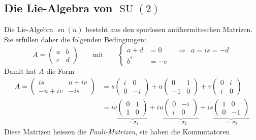 \subsection{Die Lie-Algebra von $\operatorname{SU}(2)$}
Die Lie-Algebra $\operatorname{su}(n)$ besteht aus den
spurlosen antihermiteschen Matrizen.
Sie erfüllen daher die folgenden Bedingungen:
\[
A=\begin{pmatrix}a&b\\c&d\end{pmatrix}
\qquad
\text{mit}
\qquad
\left\{
\begin{aligned}
a+d&=0&&\Rightarrow& a=is = -d
\\
b^*&=-c
\end{aligned}
\right.
\]
Damit hat $A$ die Form
\begin{align*}
A=\begin{pmatrix}
is&u+iv\\
-u+iv&-is
\end{pmatrix}
&=
s
\begin{pmatrix}
i&0\\
0&-i
\end{pmatrix}
+
u
\begin{pmatrix}
 0&1\\
-1&0
\end{pmatrix}
+
v
\begin{pmatrix}
0&i\\
i&0
\end{pmatrix}
\\
&=
iv\underbrace{\begin{pmatrix}0&1\\1&0\end{pmatrix}}_{\displaystyle=\sigma_1}
+
iu\underbrace{\begin{pmatrix}0&-i\\i&0\end{pmatrix}}_{\displaystyle=\sigma_2}
+
is\underbrace{\begin{pmatrix}1&0\\0&-1\end{pmatrix}}_{\displaystyle=\sigma_3}
\end{align*}
Diese Matrizen heissen die {\em Pauli-Matrizen}, sie haben die Kommutatoren
